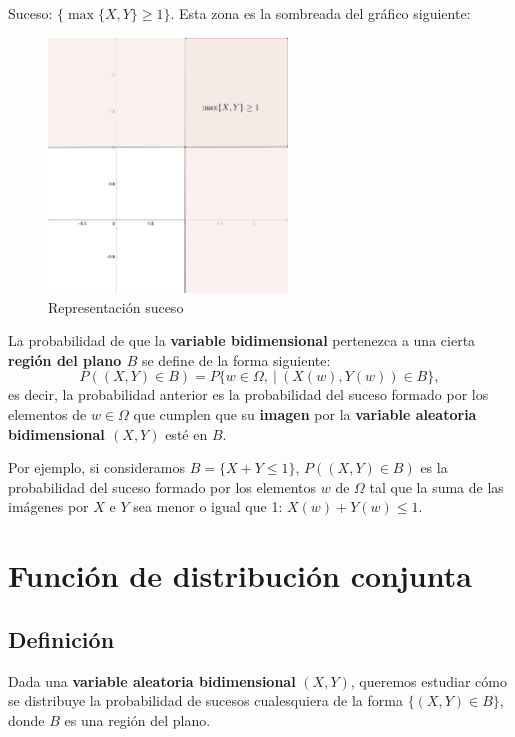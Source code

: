 \documentclass[
  letterpaper,
  DIV=11,
  numbers=noendperiod]{scrreprt}
\begin{document}
Suceso: \(\{\max\{X,Y\}\geq 1\}\). Esta zona es la sombreada del gráfico
siguiente:

\begin{figure}

{\centering \includegraphics[width=2.5in,height=\textheight]{Images/Bidim3.png}

}

\caption{Representación suceso}

\end{figure}

La probabilidad de que la \textbf{variable bidimensional} pertenezca a
una cierta \textbf{región del plano \(B\)} se define de la forma
siguiente: \[
P((X,Y)\in B)=P\{w\in \Omega,\ |\ (X(w),Y(w))\in B\},
\] es decir, la probabilidad anterior es la probabilidad del suceso
formado por los elementos de \(w\in\Omega\) que cumplen que su
\textbf{imagen} por la \textbf{variable aleatoria bidimensional
\((X,Y)\)} esté en \(B\).

Por ejemplo, si consideramos \(B=\{X+Y\leq 1\}\), \(P((X,Y)\in B)\) es
la probabilidad del suceso formado por los elementos \(w\) de \(\Omega\)
tal que la suma de las imágenes por \(X\) e \(Y\) sea menor o igual que
1: \(X(w)+Y(w)\leq 1\).

\hypertarget{funciuxf3n-de-distribuciuxf3n-conjunta}{%
\section{Función de distribución
conjunta}\label{funciuxf3n-de-distribuciuxf3n-conjunta}}

\hypertarget{definiciuxf3n-1}{%
\subsection{Definición}\label{definiciuxf3n-1}}

Dada una \textbf{variable aleatoria bidimensional} \((X,Y)\), queremos
estudiar cómo se distribuye la probabilidad de sucesos cualesquiera de
la forma \(\{(X,Y)\in B\}\), donde \(B\) es una región del plano.
\end{document}
